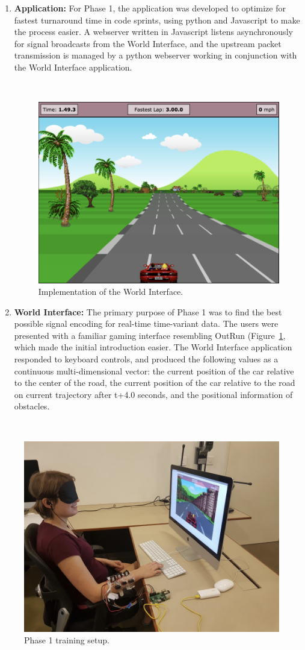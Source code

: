 \documentclass[
12pt, %
oneside, %
english, %
doublespacing, %
headsepline, %
]{MastersDoctoralThesis} %
\begin{document}
\begin{enumerate}
\item \textbf{Application:} For Phase 1, the application was developed to optimize for fastest turnaround time in code sprints, using python and Javascript to make the process easier. A webserver written in Javascript listens asynchronously for signal broadcasts from the World Interface, and the upstream packet transmission is managed by a python webserver working in conjunction with the World Interface application.

\,

\begin{figure}[h]
\centering\includegraphics[width=0.5\linewidth]{images/race.png}
\caption{Implementation of the World Interface.}
\label{fig:outrun}
\end{figure}

\item \textbf{World Interface:} The primary purpose of Phase 1 was to find the best possible signal encoding for real-time time-variant data. The users were presented with a familiar gaming interface resembling OutRun \parencite{noauthor_out_2017} (Figure~\ref{fig:outrun}, which made the initial introduction easier. The World Interface application responded to keyboard controls, and produced the following values as a continuous multi-dimensional vector: the current position of the car relative to the center of the road, the current position of the car relative to the road on current trajectory after t+4.0 seconds, and the positional information of obstacles.

\end{enumerate}

\,

\begin{figure}[h]
\centering\includegraphics[width=0.5\linewidth]{images/gameplay.png}
\decoRule
\caption[P1 experiment]{Phase 1 training setup.}
\label{fig:play}
\end{figure}
\end{document}
